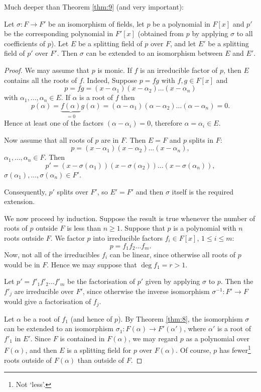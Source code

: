 Much deeper than Theorem \ref{thm:9} (and very important):

\begin{theorem}\label{thm:10}
	Let $\sigma : F \to F'$ be an isomorphism of fields, let $p$ be a polynomial in $F[x]$ and $p'$ be the corresponding polynomial in $F'[x]$ (obtained from $p$ by applying $\sigma$ to all coefficients of $p$). Let $E$ be a splitting field of $p$ over $F$, and let $E'$ be a splitting field of $p'$ over $F'$. Then $\sigma$ can be extended to an isomorphism between $E$ and $E'$.
	\begin{proof}
		We may assume that $p$ is monic. If $f$ is an irreducible factor of $p$, then $E$ contains all the roots of $f$. Indeed, Suppose $p = fg$ with $f, g \in F[x]$ and
		\[
			p = fg = (x - \alpha_1)(x - \alpha_2)\dots(x - \alpha_n)
		\]
		with $\alpha_1, \dots, \alpha_n \in E$. If $\alpha$ is a root of $f$ then
		\[
			p(\alpha) = \underbrace{f(\alpha)}_{= 0}g(\alpha) = (\alpha - \alpha_1)(\alpha - \alpha_2)\dots(\alpha - \alpha_n) = 0.
		\]
		Hence at least one of the factors $(\alpha - \alpha_i) = 0$, therefore $\alpha = \alpha_i \in E$.
		
		Now assume that all roots of $p$ are in $F$. Then $E = F$ and $p$ splits in $F$:
		\[
			p = (x - \alpha_1)(x - \alpha_2)\dots(x - \alpha_n),
		\]
		$\alpha_1, \dots, \alpha_n \in F$. Then
		\[
			p' = (x - \sigma(\alpha_1))(x - \sigma(\alpha_2))\dots(x - \sigma(\alpha_n)),
		\]
		$\sigma(\alpha_1), \dots, \sigma(\alpha_n) \in F'$.
		
		Consequently, $p'$ splits over $F'$, so $E' = F'$ and then $\sigma$ itself is the required extension.
		
		We now proceed by induction. Suppose the result is true whenever the number of roots of $p$ outside $F$ is less than $n \geq 1$. Suppose that $p$ is a polynomial with $n$ roots outside $F$. We factor $p$ into irreducible factors $f_i \in F[x]$, $1 \leq i \leq m$:
		\[
			p = f_1 f_2 \dots f_m.
		\]
		Now, not all of the irreducibles $f_i$ can be linear, since otherwise all roots of $p$ would be in $F$. Hence we may suppose that $\deg{f_1} = r > 1$.
		
		Let $p' = f'_1 f'_2 \dots f'_m$ be the factorisation of $p'$ given by applying $\sigma$ to $p$. Then the $f'_j$ are irreducible over $F'$, since otherwise the inverse isomorphism $\sigma^{-1} : F' \to F$ would give a factorisation of $f_j$.
		
		Let $\alpha$ be a root of $f_1$ (and hence of $p$). By Theorem \ref{thm:8}, the isomorphism $\sigma$ can be extended to an isomorphism $\sigma_1 : F(\alpha) \to F'(\alpha')$, where $\alpha'$ is a root of $f'_1$ in $E'$. Since $F$ is contained in $F(\alpha)$, we may regard $p$ as a polynomial over $F(\alpha)$, and then $E$ is a splitting field for $p$ over $F(\alpha)$. Of course, $p$ has fewer\footnote{Not `less'.} roots outside of $F(\alpha)$ than outside of $F$.
		

\end{proof}
\end{theorem}

